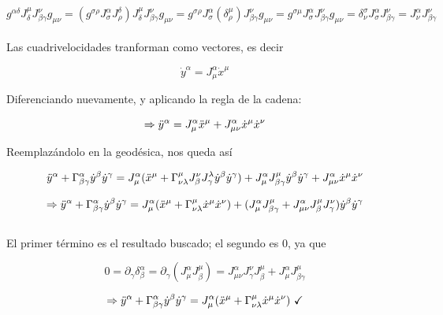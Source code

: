 $$g^{\alpha \delta}J^{\mu}_{\delta}J^{\nu}_{\beta \gamma}g_{\mu \nu} = (g^{\sigma \rho}J^{\alpha}_{\sigma}J^{\delta}_{\rho})J^{\mu}_{\delta}J^{\nu}_{\beta \gamma}g_{\mu \nu} = g^{\sigma \rho}J^{\alpha}_{\sigma}(\delta^{\mu}_{\rho})J^{\nu}_{\beta \gamma}g_{\mu \nu} = g^{\sigma \mu}J^{\alpha}_{\sigma}J^{\nu}_{\beta \gamma}g_{\mu \nu} = \delta^{\sigma}_{\nu}J^{\alpha}_{\sigma}J^{\nu}_{\beta \gamma} = J^{\alpha}_{\nu}J^{\nu}_{\beta \gamma}$$\\

Las cuadrivelocidades tranforman como vectores, es decir

$$\Dot{y}^{\alpha} = J^{\alpha}_{\mu}\Dot{x}^{\mu}$$

Diferenciando nuevamente, y aplicando la regla de la cadena:

$$\Rightarrow \Ddot{y}^{\alpha} = J^{\alpha}_{\mu}\Ddot{x}^{\mu} + J^{\alpha}_{\mu \nu}\Dot{x}^{\mu}\Dot{x}^{\nu}$$

Reemplaz\'andolo en la geod\'esica, nos queda as\'i

$$\Ddot{y}^{\alpha} + \Gamma^{\alpha}_{\beta \gamma}\Dot{y}^{\beta}\Dot{y}^{\gamma} = J^{\alpha}_{\mu}(\Ddot{x}^{\mu} + \Gamma^{\mu}_{\nu \lambda}J^{\nu}_{\beta}J^{\lambda}_{\gamma}\Dot{y}^{\beta}\Dot{y}^{\gamma}) + J^{\alpha}_{\mu}J^{\mu}_{\beta \gamma}\Dot{y}^{\beta}\Dot{y}^{\gamma} + J^{\alpha}_{\mu \nu}\Dot{x}^{\mu}\Dot{x}^{\nu}$$

$$\Rightarrow \Ddot{y}^{\alpha} + \Gamma^{\alpha}_{\beta \gamma}\Dot{y}^{\beta}\Dot{y}^{\gamma} = J^{\alpha}_{\mu}(\Ddot{x}^{\mu} + \Gamma^{\mu}_{\nu \lambda}\Dot{x}^{\mu}\Dot{x}^{\nu}) + (J^{\alpha}_{\mu}J^{\mu}_{\beta \gamma} + J^{\alpha}_{\mu \nu}J^{\mu}_{\beta}J^{\nu}_{\gamma})\Dot{y}^{\beta}\Dot{y}^{\gamma}$$\\

El primer t\'ermino es el resultado buscado; el segundo es 0, ya que

$$0 = \partial_{\gamma}\delta^{\alpha}_{\beta} = \partial_{\gamma}(J^{\alpha}_{\mu}J^{\mu}_{\beta}) = J^{\alpha}_{\mu \nu}J^{\nu}_{\gamma}J^{\mu}_{\beta} + J^{\alpha}_{\mu}J^{\mu}_{\beta \gamma}$$

$$\Rightarrow \Ddot{y}^{\alpha} + \Gamma^{\alpha}_{\beta \gamma}\Dot{y}^{\beta}\Dot{y}^{\gamma} = J^{\alpha}_{\mu}(\Ddot{x}^{\mu} + \Gamma^{\mu}_{\nu \lambda}\Dot{x}^{\mu}\Dot{x}^{\nu})\ \checkmark$$